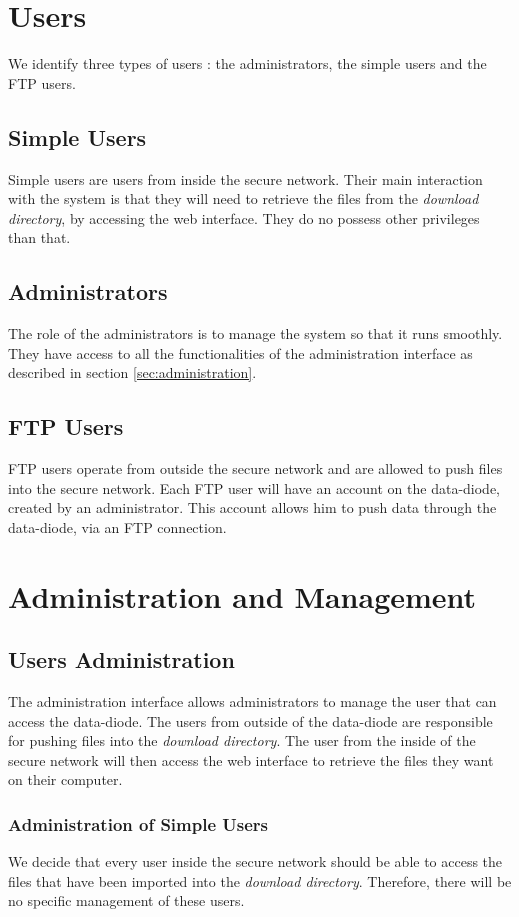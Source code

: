 \documentclass[a4paper,11pt]{article}
\begin{document}
\section{Users}
We identify three types of users : the administrators, the simple users and the FTP users.

\subsection{Simple Users}
Simple users are users from inside the secure network. Their main interaction with the system is that they will need to retrieve the files from the \textit{download directory}, by accessing the web interface. They do no possess other privileges than that.

\subsection{Administrators}
The role of the administrators is to manage the system so that it runs smoothly. They have access to all the functionalities of the administration interface as described in section \ref{sec:administration}.

\subsection{FTP Users}
FTP users operate from outside the secure network and are allowed to push files into the secure network. Each FTP user will have an account on the data-diode, created by an administrator. This account allows him to push data through the data-diode, via an FTP connection.

\section{Administration and Management}
\subsection{Users Administration}
The administration interface allows administrators to manage the user that can access the data-diode. The users from outside of the data-diode are responsible for pushing files into the \textit{download directory}. The user from the inside of the secure network will then access the web interface to retrieve the files they want on their computer.

\subsubsection{Administration of Simple Users}
We decide that every user inside the secure network should be able to access the files that have been imported into the \textit{download directory}. Therefore, there will be no specific management of these users.
\end{document}
